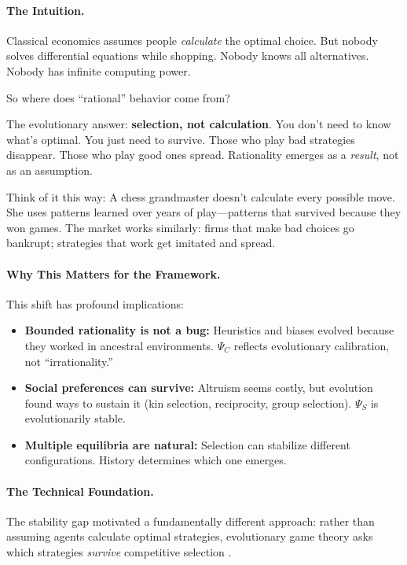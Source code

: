 \paragraph{The Intuition.}
Classical economics assumes people \emph{calculate} the optimal choice. 
But nobody solves differential equations while shopping. 
Nobody knows all alternatives. Nobody has infinite computing power.

So where does ``rational'' behavior come from?

The evolutionary answer: \textbf{selection, not calculation}.
You don't need to know what's optimal. You just need to survive.
Those who play bad strategies disappear. Those who play good ones spread.
Rationality emerges as a \emph{result}, not as an assumption.

Think of it this way: A chess grandmaster doesn't calculate every possible move.
She uses patterns learned over years of play---patterns that survived because they won games.
The market works similarly: firms that make bad choices go bankrupt; 
strategies that work get imitated and spread.

\paragraph{Why This Matters for the Framework.}
This shift has profound implications:
\begin{itemize}
  \item \textbf{Bounded rationality is not a bug:} Heuristics and biases evolved 
        because they worked in ancestral environments. $\Psi_C$ reflects evolutionary
        calibration, not ``irrationality.''
  \item \textbf{Social preferences can survive:} Altruism seems costly, but evolution 
        found ways to sustain it (kin selection, reciprocity, group selection).
        $\Psi_S$ is evolutionarily stable.
  \item \textbf{Multiple equilibria are natural:} Selection can stabilize different 
        configurations. History determines which one emerges.
\end{itemize}

\paragraph{The Technical Foundation.}
The stability gap motivated a fundamentally different approach: rather than assuming
agents calculate optimal strategies, evolutionary game theory asks which strategies
\emph{survive} competitive selection \citep{weibull1995,samuelson1997,gintis2000}.

